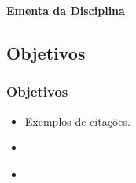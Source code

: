 {
  \begin{frame}[plain]%

    \vfill
    \centering

    \begin{block}{}
      \centering{}
      \Huge{\textbf{Ementa da Disciplina}}
    \end{block}

    \vfill

\end{frame}
} %



\subsection[Objetivos]{Objetivos}\label{subsec:ementa-objetivos}



\begin{frame}[t]\frametitle{Objetivos}

  \begin{itemize}
    \justifying{}
    \setlength\itemsep{1em}
    \item Exemplos de citações.
    \item \cite{Tanenbaum2011}
    \item \cite{Tanenbaum2016}
  \end{itemize}

\end{frame}



